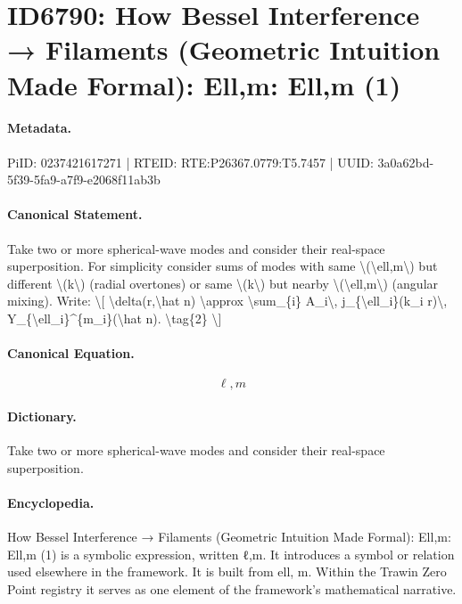 \section*{ID6790: How Bessel Interference → Filaments (Geometric Intuition Made Formal): Ell,m: Ell,m (1)}
\paragraph{Metadata.}
PiID: 0237421617271 | RTEID: RTE:P26367.0779:T5.7457 | UUID: 3a0a62bd-5f39-5fa9-a7f9-e2068f11ab3b

\paragraph{Canonical Statement.}
Take two or more spherical-wave modes and consider their real-space superposition. For simplicity consider sums of modes with same \textbackslash{}(\textbackslash{}ell,m\textbackslash{}) but different \textbackslash{}(k\textbackslash{}) (radial overtones) or same \textbackslash{}(k\textbackslash{}) but nearby \textbackslash{}(\textbackslash{}ell,m\textbackslash{}) (angular mixing). Write: \textbackslash{}[ \textbackslash{}delta(r,\textbackslash{}hat n) \textbackslash{}approx \textbackslash{}sum\_\{i\} A\_i\textbackslash{}, j\_\{\textbackslash{}ell\_i\}(k\_i r)\textbackslash{}, Y\_\{\textbackslash{}ell\_i\}\textasciicircum{}\{m\_i\}(\textbackslash{}hat n). \textbackslash{}tag\{2\} \textbackslash{}]

\paragraph{Canonical Equation.}
\[
\ell,m
\]

\paragraph{Dictionary.}
Take two or more spherical-wave modes and consider their real-space superposition.

\paragraph{Encyclopedia.}
How Bessel Interference → Filaments (Geometric Intuition Made Formal): Ell,m: Ell,m (1) is a symbolic expression, written ℓ,m. It introduces a symbol or relation used elsewhere in the framework. It is built from ell, m. Within the Trawin Zero Point registry it serves as one element of the framework's mathematical narrative.
